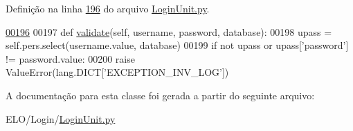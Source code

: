 Definição na linha \hyperlink{LoginUnit_8py_source_l00196}{196} do arquivo \hyperlink{LoginUnit_8py_source}{Login\-Unit.\-py}.


\begin{DoxyCode}
\hypertarget{classLogin_1_1LoginUnit_1_1BusLogin_l00196}{}\hyperlink{classLogin_1_1LoginUnit_1_1BusLogin_a2301425767b811697ce559801b955a58}{00196} 
00197     \textcolor{keyword}{def }\hyperlink{classLogin_1_1LoginUnit_1_1BusLogin_a2301425767b811697ce559801b955a58}{validate}(self, username, password, database):
00198         upass = self.pers.select(username.value, database)
00199         \textcolor{keywordflow}{if} \textcolor{keywordflow}{not} upass \textcolor{keywordflow}{or} upass[\textcolor{stringliteral}{'password'}] != password.value:
00200             \textcolor{keywordflow}{raise} ValueError(lang.DICT[\textcolor{stringliteral}{'EXCEPTION\_INV\_LOG'}])

\end{DoxyCode}


A documentação para esta classe foi gerada a partir do seguinte arquivo\-:\begin{DoxyCompactItemize}
\item 
E\-L\-O/\-Login/\hyperlink{LoginUnit_8py}{Login\-Unit.\-py}\end{DoxyCompactItemize}
